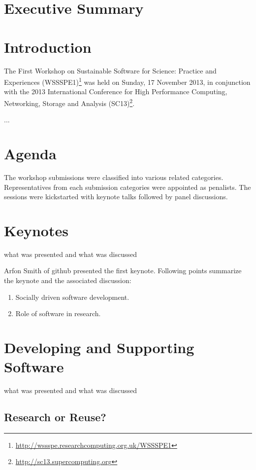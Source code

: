 \documentclass[11pt, oneside]{amsart}
\begin{document}
\pagebreak

\section*{Executive Summary}

\pagebreak

\section{Introduction}

The First Workshop on Sustainable Software for Science: Practice and Experiences (WSSSPE1)\footnote{\url{http://wssspe.researchcomputing.org.uk/WSSSPE1}} was held on Sunday, 17 November 2013, in conjunction with the 2013 International Conference for High Performance Computing, Networking, Storage and Analysis (SC13)\footnote{\url{http://sc13.supercomputing.org}}.

...

\section{Agenda}
The workshop submissions were classified into various related categories.
Representatives from each submission categories were appointed as penalists. The sessions were kickstarted with keynote talks followed by panel discussions.

\section{Keynotes}

what was presented and what was discussed

Arfon Smith of github presented the first keynote. Following points summarize the keynote and the associated discussion:
\begin{enumerate}
    \item Socially driven software development.
    \item Role of software in research.
\end{enumerate}

\section{Developing and Supporting Software}

what was presented and what was discussed

\subsection{Research or Reuse?}
\end{document}
